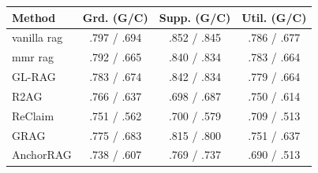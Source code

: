 \begin{tabular}{lccc}
\toprule
Method & Grd. (G/C) & Supp. (G/C) & Util. (G/C) \\
\midrule
vanilla rag & .797 / .694 & .852 / .845 & .786 / .677 \\
mmr rag & .792 / .665 & .840 / .834 & .783 / .664 \\
GL-RAG & .783 / .674 & .842 / .834 & .779 / .664 \\
R2AG & .766 / .637 & .698 / .687 & .750 / .614 \\
ReClaim & .751 / .562 & .700 / .579 & .709 / .513 \\
GRAG & .775 / .683 & .815 / .800 & .751 / .637 \\
AnchorRAG & .738 / .607 & .769 / .737 & .690 / .513 \\
\bottomrule
\end{tabular}
